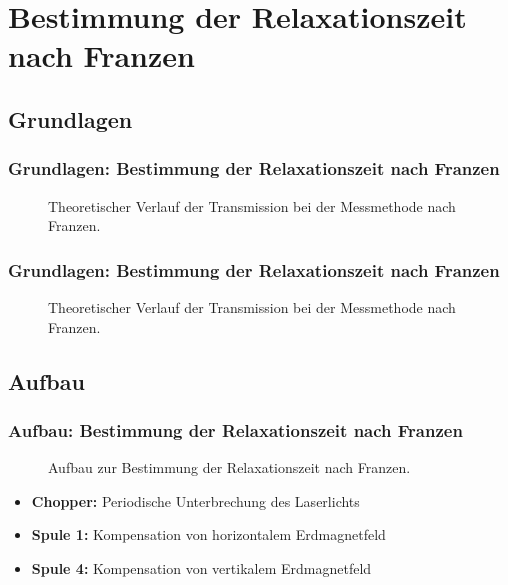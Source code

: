 
\section{Bestimmung der Relaxationszeit nach Franzen}
\subsection{Grundlagen}

\begin{frame}
\frametitle{Grundlagen: Bestimmung der Relaxationszeit nach Franzen}

\begin{figure}
    \centering
    \def\svgwidth{\textwidth}
    
    \caption{Theoretischer Verlauf der Transmission bei der Messmethode nach Franzen.}
\end{figure}

  
\end{frame}


\begin{frame}[noframenumbering]
\frametitle{Grundlagen: Bestimmung der Relaxationszeit nach Franzen}

\addtocounter{figure}{-1}
\begin{figure}
    \centering
    \def\svgwidth{\textwidth}
    
    \caption{Theoretischer Verlauf der Transmission bei der Messmethode nach Franzen.}
\end{figure}

  
\end{frame}

\subsection{Aufbau}
\begin{frame}
\frametitle{Aufbau: Bestimmung der Relaxationszeit nach Franzen}

\begin{figure}
    \centering
    \def\svgwidth{\textwidth}
    
    \caption{Aufbau zur Bestimmung der Relaxationszeit nach Franzen.}
\end{figure}

\begin{itemize}
  \item \textbf{Chopper:} Periodische Unterbrechung des Laserlichts
  \item \textbf{Spule 1:} Kompensation von horizontalem Erdmagnetfeld
  \item \textbf{Spule 4:} Kompensation von vertikalem Erdmagnetfeld
\end{itemize}

\end{frame}

